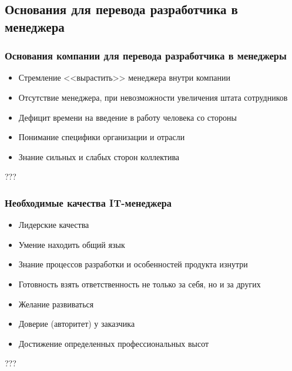\documentclass{../industrial-development}
\begin{document}
\subsection{Основания для перевода разработчика в менеджера}
\begin{frame} \frametitle{Основания компании для перевода разработчика в менеджеры}
\begin{itemize}
		\item Стремление <<вырастить>> менеджера внутри компании		
		\item Отсутствие менеджера, при невозможности увеличения штата сотрудников
		\item Дефицит времени на введение в работу человека со стороны	
		\item Понимание специфики организации и отрасли
		\item Знание сильных и слабых сторон коллектива
	\end{itemize}
\end{frame}
\lecturenotes
???

\begin{frame} \frametitle{Необходимые качества IT-менеджера}
\begin{itemize}
		\item Лидерские качества
		\item Умение находить общий язык
		\item Знание процессов разработки и особенностей продукта изнутри
		\item Готовность взять ответственность не только за себя, но и за других
		\item Желание развиваться
		\item Доверие (авторитет) у заказчика
		\item Достижение определенных профессиональных высот

	\end{itemize}
\end{frame}
\lecturenotes
???
\end{document}
